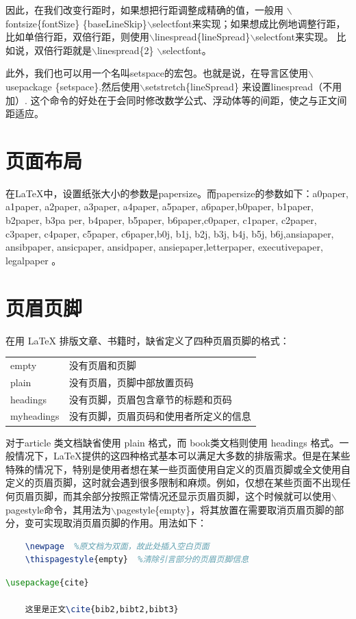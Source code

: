 \documentclass[12pt]{book}
\begin{document}
因此，在我们改变行距时，如果想把行距调整成精确的值，一般用 $\backslash$fontsize\{fontSize\} \{baseLineSkip\}$\backslash$selectfont来实现；如果想成比例地调整行距，比如单倍行距，双倍行距，则使用$\backslash$linespread\{lineSpread\}$\backslash$selectfont来实现。 比如说，双倍行距就是$\backslash$linespread\{2\} $\backslash$selectfont。

此外，我们也可以用一个名叫setspace的宏包。也就是说，在导言区使用$\backslash$usepackage \{setspace\}.然后使用$\backslash$setstretch\{lineSpread\} 来设置linespread（不用加\selectfont）. 这个命令的好处在于会同时修改数学公式、浮动体等的间距，使之与正文间距适应。

\section{页面布局}

在\LaTeX{}中，设置纸张大小的参数是papersize。而papersize的参数如下：a0paper, a1paper, a2paper, a3paper, a4paper, a5paper, a6paper,b0paper, b1paper, b2paper, b3pa per, b4paper, b5paper, b6paper,c0paper, c1paper, c2paper, c3paper, c4paper, c5paper, c6paper,b0j, b1j, b2j, b3j, b4j, b5j, b6j,ansiapaper, ansibpaper, ansicpaper, ansidpaper, ansiepaper,letterpaper, executivepaper, legalpaper 。

\section{页眉页脚}

在用 \LaTeX{} 排版文章、书籍时，缺省定义了四种页眉页脚的格式：

\begin{table}[h]
    \centering
    \begin{tabular}{ll}
        empty      & 没有页眉和页脚              \\
        plain      & 没有页眉，页脚中部放置页码        \\
        headings   & 没有页脚，页眉包含章节的标题和页码    \\
        myheadings & 没有页脚，页眉页码和使用者所定义的信息 
    \end{tabular}
\end{table}

对于article 类文档缺省使用 plain 格式，而 book类文档则使用 headings 格式。一般情况下，\LaTeX{}提供的这四种格式基本可以满足大多数的排版需求。但是在某些特殊的情况下，特别是使用者想在某一些页面使用自定义的页眉页脚或全文使用自定义的页眉页脚，这时就会遇到很多限制和麻烦。例如，仅想在某些页面不出现任何页眉页脚，而其余部分按照正常情况还显示页眉页脚，这个时候就可以使用$\backslash$pagestyle命令，其用法为$\backslash$pagestyle\{empty\}，将其放置在需要取消页眉页脚的部分，变可实现取消页眉页脚的作用。用法如下：
\begin{lstlisting}[language=tex]
    %   %引言部分
    \newpage  %原文档为双面，故此处插入空白页面
    \thispagestyle{empty}  %清除引言部分的页眉页脚信息
\end{lstlisting}
\begin{lstlisting}[language=tex]
    \usepackage{cite}
    
    这里是正文\cite{bib2,bibt2,bibt3}
\end{lstlisting}
\end{document}
